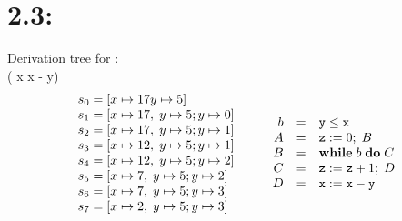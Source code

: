 \documentclass[a1paper]{paper}
\begin{document}
\section*{2.3:}
Derivation tree for :\\
 { ({ {\cass x {\cvar x - \cvar y}}})} \\
\[
\begin{array}[t]{l@{\quad\quad}l}
\begin{array}{r@{\;=\;}l}
s_0 & [x\mapsto 17 y\mapsto 5] \\
s_1 & [x\mapsto 17,\; y\mapsto 5; y\mapsto 0] \\
s_2 & [x\mapsto 17,\; y\mapsto 5; y\mapsto 1] \\
s_3 & [x\mapsto 12,\; y\mapsto 5; y\mapsto 1] \\
s_4 & [x\mapsto 12,\; y\mapsto 5; y\mapsto 2] \\
s_5 & [x\mapsto 7, \; y\mapsto 5; y\mapsto 2] \\
s_6 & [x\mapsto 7, \; y\mapsto 5; y\mapsto 3] \\
s_7 & [x\mapsto 2, \; y\mapsto 5; y\mapsto 3] \\
\end{array}
&
\begin{array}{r@{\quad=\quad}l}
b & \cvar{y}\le\cvar{x} \\
A & \ccomp {\cass z 0} B \\
B & \cwhile b C \\
C & \ccomp {\cass z {\cvar z + 1}} D \\
D & \cass x {\cvar x - \cvar y} \\
\end{array}
\end{array}
\]
\end{document}

